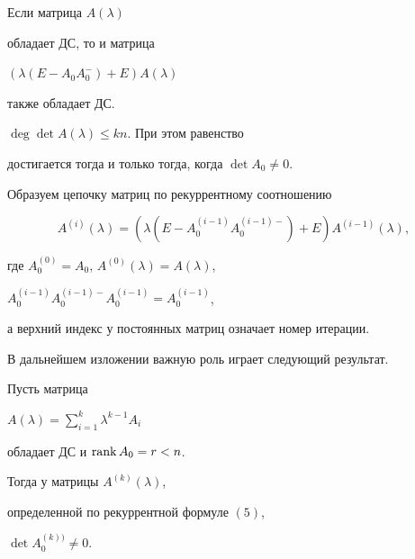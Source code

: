  


\begin{pty} Если матрица $A(\lambda)$ 


обладает ДС, то и матрица 


$(\lambda(E-A_0A^-_0)+E)A(\lambda)$ 


также обладает ДС. 


\end{pty} 


 


\begin{pty} $\deg\det A(\lambda)\le kn$. При этом равенство 


достигается тогда и только тогда, когда $\det A_0\ne 0$. 


\end{pty} 


 


Образуем цепочку матриц по рекуррентному соотношению 


\begin{equation} 


A^{(i)}(\lambda)=(\lambda(E-A^{(i-1)}_0 


A^{(i-1)-}_0)+E)A^{(i-1)}(\lambda), 


\end{equation} 


где $A^{(0)}_0=A_0$, $A^{(0)}(\lambda)=A(\lambda)$, 


$A^{(i-1)}_0A^{(i-1)-}_0A^{(i-1)}_0=A^{(i-1)}_0$, 


а верхний индекс у постоянных матриц означает номер итерации. 


 


В дальнейшем изложении важную роль играет следующий результат. 


 


\begin{thm} Пусть матрица 


$A(\lambda)=\sum\limits^k_{i=1}\lambda^{k-1}A_i$ 


обладает ДС и $\operatorname{rank} A_0=r<n$. 


Тогда у матрицы $A^{(k)}(\lambda)$, 


определенной по рекуррентной формуле $(5)$, 


$\det A^{(k))}_0\ne 0$. 


\end{thm} 


